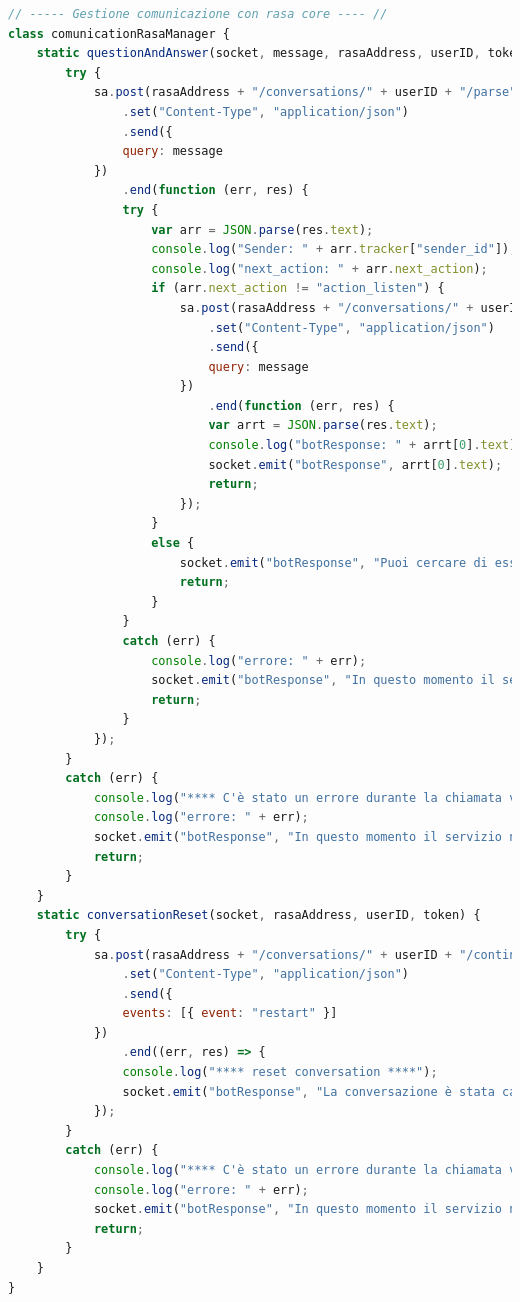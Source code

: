 \begin{lstlisting}[language=JavaScript]
// ----- Gestione comunicazione con rasa core ---- //
class comunicationRasaManager {
    static questionAndAnswer(socket, message, rasaAddress, userID, token) {
        try {
            sa.post(rasaAddress + "/conversations/" + userID + "/parse" + "?token=" + token)
                .set("Content-Type", "application/json")
                .send({
                query: message
            })
                .end(function (err, res) {
                try {
                    var arr = JSON.parse(res.text);
                    console.log("Sender: " + arr.tracker["sender_id"]);
                    console.log("next_action: " + arr.next_action);
                    if (arr.next_action != "action_listen") {
                        sa.post(rasaAddress + "/conversations/" + userID + "/respond?token=" + token)
                            .set("Content-Type", "application/json")
                            .send({
                            query: message
                        })
                            .end(function (err, res) {
                            var arrt = JSON.parse(res.text);
                            console.log("botResponse: " + arrt[0].text);
                            socket.emit("botResponse", arrt[0].text);
                            return;
                        });
                    }
                    else {
                        socket.emit("botResponse", "Puoi cercare di essere più chiaro?");
                        return;
                    }
                }
                catch (err) {
                    console.log("errore: " + err);
                    socket.emit("botResponse", "In questo momento il servizio non è attivo, riprovare più tardi!");
                    return;
                }
            });
        }
        catch (err) {
            console.log("**** C'è stato un errore durante la chiamata verso rasa ****");
            console.log("errore: " + err);
            socket.emit("botResponse", "In questo momento il servizio non è attivo, riprovare più tardi!");
            return;
        }
    }
    static conversationReset(socket, rasaAddress, userID, token) {
        try {
            sa.post(rasaAddress + "/conversations/" + userID + "/continue?token=" + token)
                .set("Content-Type", "application/json")
                .send({
                events: [{ event: "restart" }]
            })
                .end((err, res) => {
                console.log("**** reset conversation ****");
                socket.emit("botResponse", "La conversazione è stata cancellata");
            });
        }
        catch (err) {
            console.log("**** C'è stato un errore durante la chiamata verso rasa ****");
            console.log("errore: " + err);
            socket.emit("botResponse", "In questo momento il servizio non è attivo, riprovare più tardi!");
            return;
        }
    }
}
\end{lstlisting}

